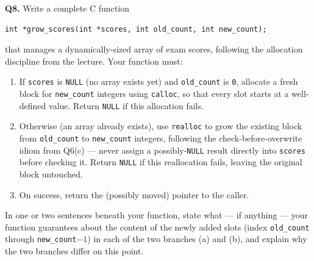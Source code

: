 \documentclass[11pt]{article}
\begin{document}
\textbf{Q8.} Write a complete C function
\begin{verbatim}
int *grow_scores(int *scores, int old_count, int new_count);
\end{verbatim}
that manages a dynamically-sized array of exam scores, following the allocation discipline from the lecture. Your function must:
\begin{enumerate}
  \item[(a)] If \texttt{scores} is \texttt{NULL} (no array exists yet) and \texttt{old\_count} is \texttt{0}, allocate a fresh block for \texttt{new\_count} integers using \texttt{calloc}, so that every slot starts at a well-defined value. Return \texttt{NULL} if this allocation fails.
  \item[(b)] Otherwise (an array already exists), use \texttt{realloc} to grow the existing block from \texttt{old\_count} to \texttt{new\_count} integers, following the check-before-overwrite idiom from Q6(c) --- never assign a possibly-\texttt{NULL} result directly into \texttt{scores} before checking it. Return \texttt{NULL} if this reallocation fails, leaving the original block untouched.
  \item[(c)] On success, return the (possibly moved) pointer to the caller.
\end{enumerate}
In one or two sentences beneath your function, state what --- if anything --- your function guarantees about the content of the newly added slots (index \texttt{old\_count} through \texttt{new\_count}$-1$) in each of the two branches (a) and (b), and explain why the two branches differ on this point.
\end{document}
